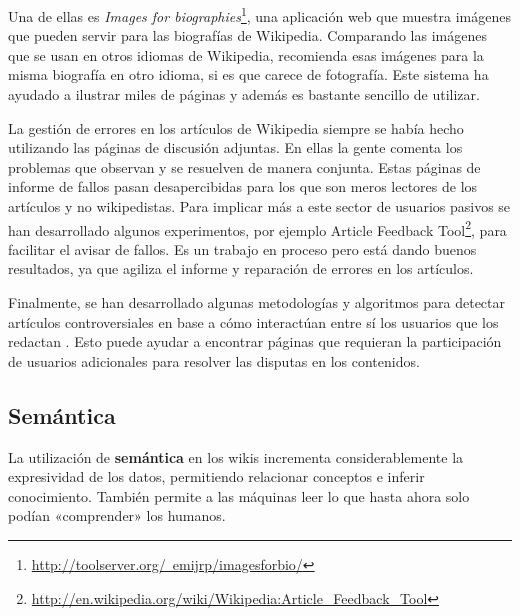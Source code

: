 \documentclass[11pt,onecolumn]{article}
\begin{document}


Una de ellas es \emph{Images for biographies}\footnote{\href{http://toolserver.org/~emijrp/imagesforbio/}{http://toolserver.org/~emijrp/imagesforbio/}}, una aplicación web que muestra imágenes que pueden servir para las biografías de Wikipedia. Comparando las imágenes que se usan en otros idiomas de Wikipedia, recomienda esas imágenes para la misma biografía en otro idioma, si es que carece de fotografía. Este sistema ha ayudado a ilustrar miles de páginas y además es bastante sencillo de utilizar.


La gestión de errores en los artículos de Wikipedia siempre se había hecho utilizando las páginas de discusión adjuntas. En ellas la gente comenta los problemas que observan y se resuelven de manera conjunta. Estas páginas de informe de fallos pasan desapercibidas para los que son meros lectores de los artículos y no wikipedistas. Para implicar más a este sector de usuarios pasivos se han desarrollado algunos experimentos, por ejemplo Article Feedback Tool\footnote{\href{http://en.wikipedia.org/wiki/Wikipedia:Article_Feedback_Tool}{http://en.wikipedia.org/wiki/Wikipedia:Article\_Feedback\_Tool}}, para facilitar el avisar de fallos. Es un trabajo en proceso pero está dando buenos resultados, ya que agiliza el informe y reparación de errores en los artículos.


Finalmente, se han desarrollado algunas metodologías y algoritmos para detectar artículos controversiales en base a cómo interactúan entre sí los usuarios que los redactan \citep{sepehrirad2012}. Esto puede ayudar a encontrar páginas que requieran la participación de usuarios adicionales para resolver las disputas en los contenidos.

\subsection{Semántica}


La utilización de \textbf{semántica} en los wikis incrementa considerablemente la expresividad de los datos, permitiendo relacionar conceptos e inferir conocimiento. También permite a las máquinas leer lo que hasta ahora solo podían «comprender» los humanos.
\end{document}
